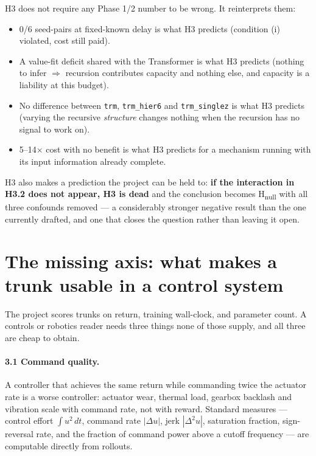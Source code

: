 \documentclass[11pt]{article}
\newcommand{\code}[1]{\texttt{\small #1}}
\begin{document}
H3 does not require any Phase 1/2 number to be wrong. It reinterprets them:

\begin{itemize}[leftmargin=1.4em,itemsep=1pt]
\item 0/6 seed-pairs at fixed-known delay is what H3 predicts (condition (i) violated, cost still paid).
\item A value-fit deficit shared with the Transformer is what H3 predicts (nothing to infer $\Rightarrow$ recursion contributes capacity and nothing else, and capacity is a liability at this budget).
\item No difference between \code{trm}, \code{trm\_hier6} and \code{trm\_singlez} is what H3 predicts (varying the recursive \emph{structure} changes nothing when the recursion has no signal to work on).
\item 5--14$\times$ cost with no benefit is what H3 predicts for a mechanism running with its input information already complete.
\end{itemize}

H3 also makes a prediction the project can be held to: \textbf{if the interaction in H3.2 does not appear, H3 is dead} and the conclusion becomes H\textsubscript{null} with all three confounds removed --- a considerably stronger negative result than the one currently drafted, and one that closes the question rather than leaving it open.

\section{The missing axis: what makes a trunk usable in a control system}

The project scores trunks on return, training wall-clock, and parameter count. A controls or robotics reader needs three things none of those supply, and all three are cheap to obtain.

\paragraph{3.1 Command quality.} A controller that achieves the same return while commanding twice the actuator rate is a worse controller: actuator wear, thermal load, gearbox backlash and vibration scale with command rate, not with reward. Standard measures --- control effort $\int u^2\,dt$, command rate $|\Delta u|$, jerk $|\Delta^2 u|$, saturation fraction, sign-reversal rate, and the fraction of command power above a cutoff frequency --- are computable directly from rollouts.
\end{document}
